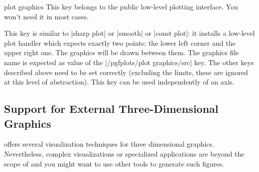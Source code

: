 {{\begin{pgfplotskey}{plot graphics}
    This key belongs to the public low-level plotting interface. You won't need
    it in most cases.

    This key is similar to |sharp plot| or |smooth| or |const plot|: it
    installs a low-level plot handler which expects exactly two points: the
    lower left corner and the upper right one. The graphics will be drawn
    between them. The graphics file name is expected as value of the
    |/pgfplots/plot graphics/src| key. The other keys described above need to
    be set correctly (excluding the limits, these are ignored at this level of
    abstraction). This key can be used independently of an axis.
\end{pgfplotskey}



\subsection*{Support for External Three-Dimensional Graphics}
\label{sec:plotgraphics3d}

\PGFPlots{} offers several visualization techniques for three dimensional
graphics. Nevertheless, complex visualizations or specialized applications are
beyond the scope of \PGFPlots{} and you might want to use other tools to
generate such figures.

}}
